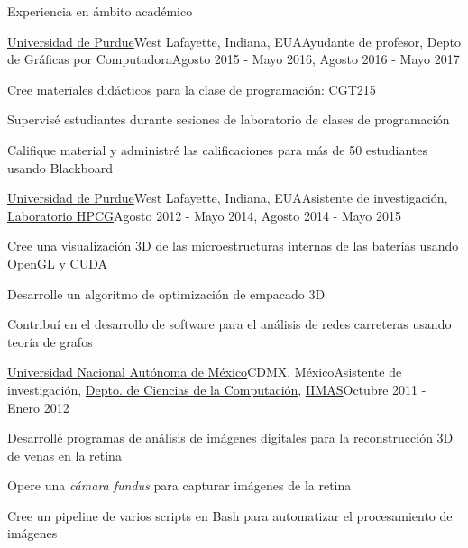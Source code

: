 \documentclass{resume} %
\begin{document}
\clearpage



\begin{rSection}{Experiencia en ámbito académico}

	\begin{rSubsection}{\href{http://www.purdue.edu}{Universidad de Purdue}}{West Lafayette, Indiana, EUA}{Ayudante de profesor, Depto de Gráficas por Computadora}{Agosto 2015 - Mayo 2016, Agosto 2016 - Mayo 2017}
	\item Cree materiales didácticos para la clase de programación: \href{https://polytechnic.purdue.edu/sites/default/files/CGT-fall-2017.pdf}{CGT215}
	\item Supervisé estudiantes durante sesiones de laboratorio de clases de programación
	\item Califique material y administré las calificaciones para más de 50 estudiantes usando Blackboard
	\end{rSubsection}

	\begin{rSubsection}{\href{http://www.purdue.edu}{Universidad de Purdue}}{West Lafayette, Indiana, EUA}{Asistente de investigación, \href{http://hpcg.purdue.edu/}{Laboratorio HPCG}}{Agosto 2012 - Mayo 2014, Agosto 2014 - Mayo 2015}
	\item Cree una visualización 3D de las microestructuras internas de las baterías usando OpenGL y CUDA
	\item Desarrolle un algoritmo de optimización de empacado 3D
	\item Contribuí en el desarrollo de software para el análisis de redes carreteras usando teoría de grafos
	\end{rSubsection}
	
	\begin{rSubsection}{\href{http://www.unam.mx}{Universidad Nacional Autónoma de México}}{CDMX, México}{Asistente de investigación, \href{https://turing.iimas.unam.mx/}{Depto. de Ciencias de la Computación}, \href{https://www.iimas.unam.mx/}{IIMAS}}{Octubre 2011 - Enero 2012}
	\item Desarrollé programas de análisis de imágenes digitales para la reconstrucción 3D de venas en la retina
	\item Opere una \emph{cámara fundus} para capturar imágenes de la retina
	\item Cree un pipeline de varios scripts en Bash para automatizar el procesamiento de imágenes
	\end{rSubsection}
	

\end{rSection}
\end{document}
